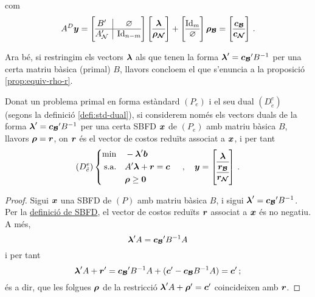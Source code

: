 com
\begin{equation}\label{eq:partition2}
A^D\vb{y} = \left[\begin{array}{{@{}c|c@{}}}
B'	  &	\varnothing	\\
\hline
A_\N' & \Id_{n-m}
\end{array}\right]
%
\left[\begin{array}{{@{}c@{}}}
\vb{\lambda}\\
\hline
\vb{\rho_\N}
\end{array}\right]
%
+
%
\left[\begin{array}{{@{}c@{}}}
\Id_m\\
\hline
\varnothing
\end{array}\right]
%
\vb{\rho_\B}
%
=
\left[\begin{array}{{@{}c@{}}}
\vb{c_\B}\\
\hline
\vb{c_\N}
\end{array}\right]\,.
\end{equation}

Ara bé, si restringim els vectors $\boldsymbol{\lambda}$ als que tenen la forma 
$\boldsymbol{\lambda}'=\boldsymbol{c_{\mathcal{B}}}'B^{-1}$ per una certa matriu bàsica (primal) $B$, 
llavors concloem el que s'enuncia a la proposició \ref{prop:equiv-rho-r}.


\begin{prop}\label{prop:equiv-rho-r}
	Donat un problema primal en forma estàndard $(P_e)$ i el seu dual
	$(D^e_{\tilde{e}})$ (segons la definició \ref{defi:std-dual}), si considerem
	només els vectors duals de la forma $\boldsymbol{\lambda}'=\boldsymbol{c_{\mathcal{B}}}'B^{-1}$ per una
	certa SBFD  $\boldsymbol{x}$ de $(P_e)$ amb matriu bàsica $B$, llavors $\boldsymbol{\rho} =
	\boldsymbol{r}$, on $\boldsymbol{r}$ és el vector de costos reduïts associat a $\boldsymbol{x}$, i 
	per
	tant
	\[
	(D^e_{\tilde{e}})
	\begin{cases}
	\begin{aligned}
	\min 			&&& -\vb{\lambda}'\vb{b}\\
	\text{s.a.}		&&& A'\vb{\lambda} +  \vb{r} = \vb{c}\\
	&&& \vb{\rho} \ge \vb{0}
	\end{aligned}
	\end{cases}\,, 
	\quad \vb{y} =
	\left[
	\begin{array}{@{}c@{}}
	\vb{\lambda}\\
	\hline
	\vb{r_\B}\\
	\hline
	\vb{r_\N}
	\end{array}
	\right]\,.
	\]
	
	\begin{proof}
		Sigui $\boldsymbol{x}$ una SBFD de $(P)$ amb matriu bàsica $B$, i sigui 
		$\boldsymbol{\lambda}'
		= \boldsymbol{c_{\mathcal{B}}}'B^{-1}$. Per la \hyperref[defi:SBFD]{definició de SBFD}, el 
		vector
		de costos reduïts $\boldsymbol{r}$ associat a $\boldsymbol{x}$ és no negatiu. A més,
		\[
		\boldsymbol{\lambda}'A = \boldsymbol{c_{\mathcal{B}}}'B^{-1}A
		\] 
		i per tant
		\[
		\boldsymbol{\lambda}'A + \boldsymbol{r}' = \boldsymbol{c_{\mathcal{B}}}'B^{-1}A + (\boldsymbol{c}' - 
		\boldsymbol{c_{\mathcal{B}}}B^{-1}A) =
		\boldsymbol{c}'\,;
		\]
		és a dir, que les folgues $\boldsymbol{\rho}$ de la restricció $\boldsymbol{\lambda}'A 
		+ 
		\boldsymbol{\rho}' = \boldsymbol{c}'$ coincideixen amb $\boldsymbol{r}$.
	\end{proof}
\end{prop}

